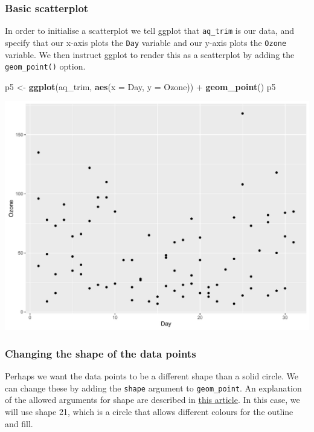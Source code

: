 \documentclass[]{article}
\newenvironment{Shaded}{\begin{snugshade}}{\end{snugshade}}
\newcommand{\KeywordTok}[1]{\textcolor[rgb]{0.13,0.29,0.53}{\textbf{{#1}}}}
\newcommand{\DataTypeTok}[1]{\textcolor[rgb]{0.13,0.29,0.53}{{#1}}}
\newcommand{\StringTok}[1]{\textcolor[rgb]{0.31,0.60,0.02}{{#1}}}
\newcommand{\NormalTok}[1]{{#1}}
\begin{document}
\subsubsection{Basic scatterplot}\label{basic-scatterplot}

In order to initialise a scatterplot we tell ggplot that
\texttt{aq\_trim} is our data, and specify that our x-axis plots the
\texttt{Day} variable and our y-axis plots the \texttt{Ozone} variable.
We then instruct ggplot to render this as a scatterplot by adding the
\texttt{geom\_point()} option.

\begin{Shaded}
\begin{Highlighting}[]
\NormalTok{p5 <-}\StringTok{ }\KeywordTok{ggplot}\NormalTok{(aq_trim, }\KeywordTok{aes}\NormalTok{(}\DataTypeTok{x =} \NormalTok{Day, }\DataTypeTok{y =} \NormalTok{Ozone)) +}\StringTok{ }
\StringTok{      }\KeywordTok{geom_point}\NormalTok{()}
\NormalTok{p5}
\end{Highlighting}
\end{Shaded}

\begin{center}\includegraphics{0_all_posts_pdf/scatter_1-1} \end{center}

\subsubsection{Changing the shape of the data
points}\label{changing-the-shape-of-the-data-points}

Perhaps we want the data points to be a different shape than a solid
circle. We can change these by adding the \texttt{shape} argument to
\texttt{geom\_point}. An explanation of the allowed arguments for shape
are described in
\href{http://sape.inf.usi.ch/quick-reference/ggplot2/shape}{this
article}. In this case, we will use shape 21, which is a circle that
allows different colours for the outline and fill.
\end{document}
